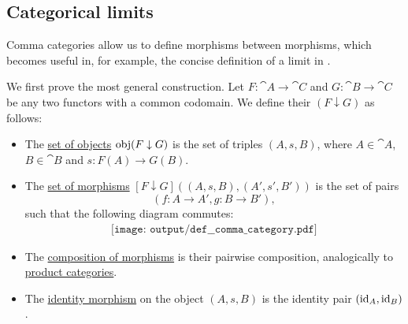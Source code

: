 \subsection{Categorical limits}\label{subsec:categorical_limits}

\begin{definition}\label{def:comma_category}
  Comma categories allow us to define morphisms between morphisms, which becomes useful in, for example, the concise definition of a limit in .

  \begin{thmenum}
     We first prove the most general construction. Let \( F: \cat{A} \to \cat{C} \) and \( G: \cat{B} \to \cat{C} \) be any two functors with a common codomain. We define their  \( (F \downarrow G) \) as follows:

    \begin{itemize}
      \item The \hyperref[def:category/objects]{set of objects} \( \operatorname{obj}(F \downarrow G) \) is the set of triples \( (A, s, B) \), where \( A \in \cat{A} \), \( B \in \cat{B} \) and \( s: F(A) \to G(B) \).

      \item The \hyperref[def:category/morphisms]{set of morphisms} \( [F \downarrow G]((A, s, B), (A', s', B')) \) is the set of pairs
      \begin{equation*}
        (f: A \to A', g: B \to B'),
      \end{equation*}
      such that the following diagram commutes:
      \begin{equation}\label{eq:def:comma_category/variable}
        \begin{aligned}
          \texttt{[image: output/def\_\_comma\_category.pdf]}
        \end{aligned}
      \end{equation}

      \item The \hyperref[def:category/composition]{composition of morphisms} is their pairwise composition, analogically to \hyperref[def:product_category]{product categories}.

      \item The \hyperref[def:category/identity]{identity morphism} on the object \( (A, s, B) \) is the identity pair \( (\operatorname{id}_A, \operatorname{id}_B) \).
    \end{itemize}


\end{thmenum}
\end{definition}
